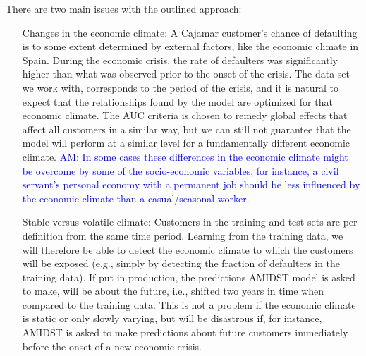 \documentclass{article}
\theoremstyle{theorem}
\theoremstyle{definition}
\begin{document}
There are two main issues with the outlined approach:
\begin{itemize}

\item[Changes in the economic climate:]  A Cajamar customer's chance of defaulting is to some  extent determined by external factors, like the economic climate in Spain. During the economic crisis, the rate of defaulters was significantly higher than what was observed prior to the onset of the crisis. The data set we work with, corresponds to the period of the crisis, and it is natural to expect that the relationships found by the model are optimized for that economic climate. The AUC criteria is chosen to remedy global effects that affect all customers in a similar way, but we can still not guarantee that the model will perform at a similar level for a fundamentally different economic climate. \textcolor{blue}{AM: In some cases these differences in the economic climate might be overcome by some of the socio-economic variables, for instance, a civil servant's personal economy with a permanent job should be less influenced by the economic climate than a casual/seasonal worker}.

\item[Stable versus volatile climate:] Customers in the training and test sets are per definition from the same time period. Learning from the training data, we will therefore be able to detect the economic climate to which the customers will be exposed (e.g., simply by detecting the fraction of defaulters in the training data). If put in production, the predictions AMIDST model is asked to make, will be about the future, i.e., shifted two years in time when compared to the training data. This is not a problem if the economic climate is static or only slowly varying, but will be disastrous if, for instance, AMIDST is asked to make predictions about future customers immediately before the onset of a new economic crisis.

\end{itemize}
\end{document}

